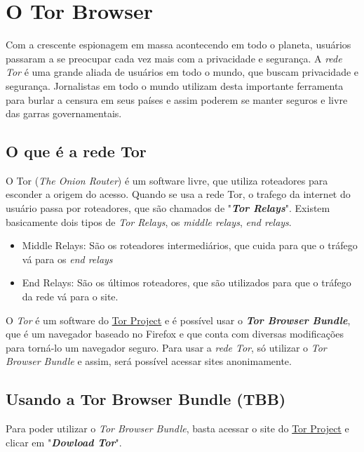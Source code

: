 \documentclass[12pt, letterpaper, DejaVuSansMono:12]{report}
\begin{document}
\section{O Tor Browser}
	Com a crescente espionagem em massa acontecendo em todo o planeta, usuários passaram a se preocupar cada vez mais com a privacidade e segurança. A \textit{rede Tor} é uma grande aliada de usuários em todo o mundo, que buscam privacidade e segurança. Jornalistas em todo o mundo utilizam desta importante ferramenta para burlar a censura em seus países e assim poderem se manter seguros e livre das garras governamentais.\\

\subsection{O que é a rede Tor}
	O Tor (\textit{The Onion Router}) é um software livre, que utiliza roteadores para esconder a origem do acesso. Quando se usa a rede Tor, o trafego da internet do usuário passa por roteadores, que são chamados de "\textbf{\textit{Tor Relays}}". Existem basicamente dois tipos de \textit{Tor Relays}, os \textit{middle relays}, \textit{end relays}.

	\begin{itemize}
		\item Middle Relays: São os roteadores intermediários, que cuida para que o tráfego vá para os \textit{end relays}
		\item End Relays: São os últimos roteadores, que são utilizados para que o tráfego da rede vá para o site.
	\end{itemize}

	O \textit{Tor} é um software do \href{http://torproject.org/}{Tor Project} e é possível usar o \textbf{\textit{Tor Browser Bundle}}, que é um navegador baseado no Firefox e que conta com diversas modificações para torná-lo um navegador seguro. Para usar a \textit{rede Tor}, só utilizar o \textit{Tor Browser Bundle} e assim, será possível acessar sites anonimamente.\\

\subsection{Usando a Tor Browser Bundle (TBB)}
	Para poder utilizar o \textit{Tor Browser Bundle}, basta acessar o site do \href{http://torproject.org/}{Tor Project} e clicar em "\textit{\textbf{Dowload Tor}}".
\end{document}
